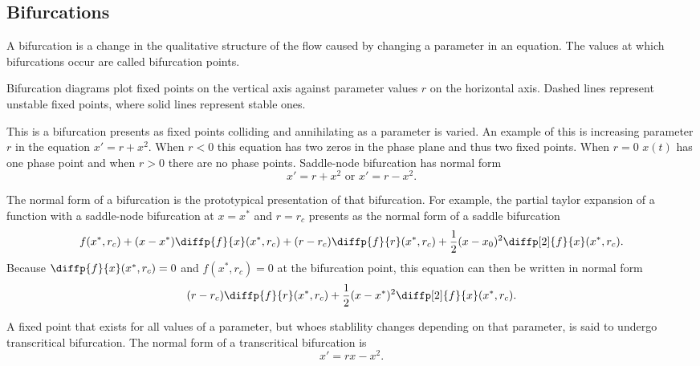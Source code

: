 \documentclass{article}
\begin{document}
\subsection{Bifurcations}
\begin{definition}[Bifurcation]
	A bifurcation is a change in the qualitative structure of the flow caused by changing a parameter in an equation. The values at which bifurcations occur are called bifurcation points.
\end{definition}
\begin{remark}
	Bifurcation diagrams plot fixed points on the vertical axis against parameter values \(r\) on the horizontal axis. Dashed lines represent unstable fixed points, where solid lines represent stable ones.
\end{remark}
\begin{definition}
	This is a bifurcation presents as fixed points colliding and annihilating as a parameter is varied. An example of this is increasing parameter \(r\) in the equation \(x'=r+x^2\). When \(r<0\) this equation has two zeros in the phase plane and thus two fixed points. When \(r=0\) \(x(t)\) has one phase point and when \(r>0\) there are no phase points. Saddle-node bifurcation has normal form
	\begin{equation*}
		x'=r+x^2\text{ or }x'=r-x^2.
	\end{equation*}
\end{definition}
\clearpage
\begin{definition}
	The normal form of a bifurcation is the prototypical presentation of that bifurcation. For example, the partial taylor expansion of a function with a saddle-node bifurcation at \(x=x^*\) and \(r=r_c\) presents as the normal form of a saddle bifurcation
	\begin{equation*}
		f(x^*,r_c)+(x-x^*)\diffp{f}{x}(x^*,r_c)+(r-r_c)\diffp{f}{r}(x^*,r_c)+\frac{1}{2}(x-x_0)^2\diffp[2]{f}{x}(x^*,r_c).
	\end{equation*}
	Because \(\diffp{f}{x}(x^*,r_c)=0\) and \(f(x^*,r_c)=0\) at the bifurcation point, this equation can then be written in normal form
	\begin{equation*}
		(r-r_c)\diffp{f}{r}(x^*,r_c)+\frac{1}{2}(x-x^*)^2\diffp[2]{f}{x}(x^*,r_c).
	\end{equation*}
\end{definition}
\begin{definition}
	A fixed point that exists for all values of a parameter, but whoes stablility changes depending on that parameter, is said to undergo transcritical bifurcation. The normal form of a transcritical bifurcation is
	\begin{equation*}
		x'=rx-x^2.
	\end{equation*}
\end{definition}
\end{document}
